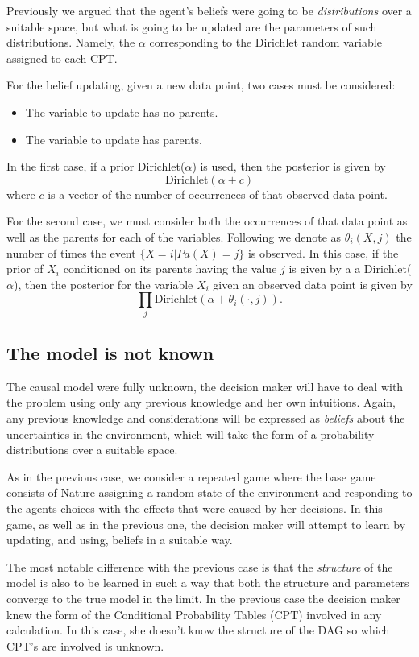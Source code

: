\documentclass{article}
\begin{document}
Previously we argued that the agent's beliefs were going to be \textit{distributions} over a suitable space, but what is going to be updated are the parameters of such distributions. Namely, the $\alpha$ corresponding to the Dirichlet random variable assigned to each CPT.

For the belief updating, given a new data point, two cases must be considered:
\begin{itemize}
\item The variable to update has no parents.
\item The variable to update has parents.
\end{itemize}

In the first case, if a prior Dirichlet($\alpha$) is used, then the posterior is given by
\[ \textrm{Dirichlet}(\alpha + c) \]
where $c$ is a vector of the number of occurrences of that observed data point. 

For the second case, we must consider both the occurrences of that data point as well as the parents for each of the variables. Following \cite{barber2012bayesian} we denote as $\theta_i(X,j)$ the number of times the event $\{X=i | Pa(X)=j\}$ is observed. In this case, if the prior of $X_i$ conditioned on its parents having the value $j$ is given by a a Dirichlet($\alpha$), then the posterior for the variable $X_i$ given an observed data point is given by 
\[ \prod_j \textrm{Dirichlet}(\alpha + \theta_i(\cdot,j)). \]

\subsection{The model is not known}
The causal model were fully unknown, the decision maker will have to deal with the problem using only any previous knowledge and her own intuitions. Again, any previous knowledge and considerations will be expressed as \textit{beliefs} about the uncertainties in the environment, which will take the form of a probability distributions over a suitable space. 

As in the previous case, we consider a repeated game where the base game consists of Nature assigning a random state of the environment and responding to the agents choices with the effects that were caused by her decisions. In this game, as well as in the previous one, the decision maker will attempt to learn by updating, and using, beliefs in a suitable way. 

The most notable difference with the previous case is that the \textit{structure} of the model is also to be learned in such a way that both the structure and parameters converge to the true model in the limit. In the previous case the decision maker knew the form of the Conditional Probability Tables (CPT) involved in any calculation. In this case, she doesn't know the structure of the DAG so which CPT's are involved is unknown.
\end{document}

